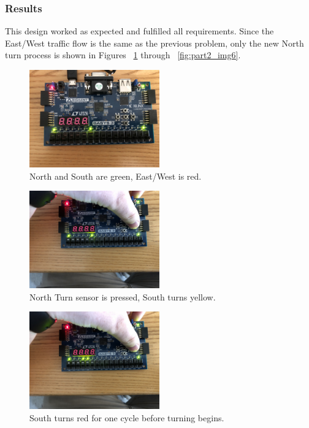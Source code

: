 \documentclass[11pt]{article}
\begin{document}
\subsubsection{Results}
This design worked as expected and fulfilled all requirements. Since the East/West traffic flow is the same as the previous problem, only the new North turn process is shown in Figures ~\ref{fig:part2_img1} through ~\ref{fig:part2_img6}.

\begin{figure}[H]
\begin{center}
	\includegraphics[width=0.5\textwidth]{./images/Part2/l9p2img1.jpg}
	\caption{\label{fig:part2_img1}North and South are green, East/West is red.}
\end{center}
\end{figure}

\begin{figure}[H]
\begin{center}
	\includegraphics[width=0.5\textwidth]{./images/Part2/l9p2img2.jpg}
	\caption{\label{fig:part2_img2}North Turn sensor is pressed, South turns yellow.}
\end{center}
\end{figure}

\begin{figure}[H]
\begin{center}
	\includegraphics[width=0.5\textwidth]{./images/Part2/l9p2img3.jpg}
	\caption{\label{fig:part2_img3}South turns red for one cycle before turning begins.}
\end{center}
\end{figure}
\end{document}
